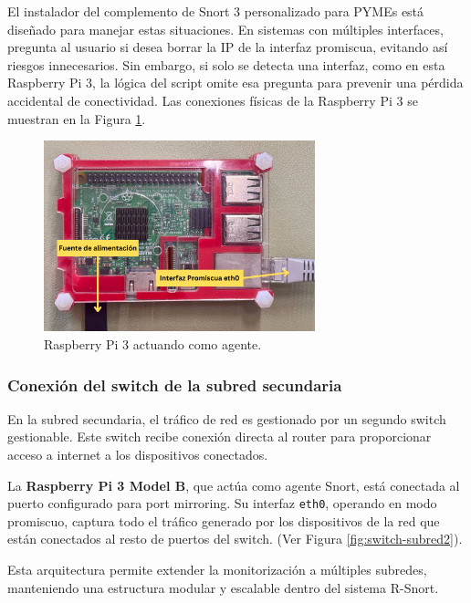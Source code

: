 \documentclass[11pt,a4paper,twoside]{report}
\begin{document}
El instalador del complemento de Snort 3 personalizado para PYMEs está diseñado para manejar estas situaciones. En sistemas con múltiples interfaces, pregunta al usuario si desea borrar la IP de la interfaz promiscua, evitando así riesgos innecesarios. Sin embargo, si solo se detecta una interfaz, como en esta Raspberry Pi 3, la lógica del script omite esa pregunta para prevenir una pérdida accidental de conectividad. Las conexiones físicas de la Raspberry Pi 3 se muestran en la Figura \ref{fig:conexion-agente-rpi3}.

\begin{figure}[H]
	\centering
	\includegraphics[width=0.7\textwidth]{install/0.3.png}
	\caption{Raspberry Pi 3 actuando como agente.}
	\label{fig:conexion-agente-rpi3}
\end{figure}


\subsubsection{Conexión del switch de la subred secundaria}

En la subred secundaria, el tráfico de red es gestionado por un segundo switch gestionable. Este switch recibe conexión directa al router para proporcionar acceso a internet a los dispositivos conectados.\newline

La \textbf{Raspberry Pi 3 Model B}, que actúa como agente Snort, está conectada al puerto configurado para port mirroring. Su interfaz \texttt{eth0}, operando en modo promiscuo, captura todo el tráfico generado por los dispositivos de la red que están conectados al resto de puertos del switch. (Ver Figura \ref{fig:switch-subred2}).\newline

Esta arquitectura permite extender la monitorización a múltiples subredes, manteniendo una estructura modular y escalable dentro del sistema R-Snort.
\end{document}
